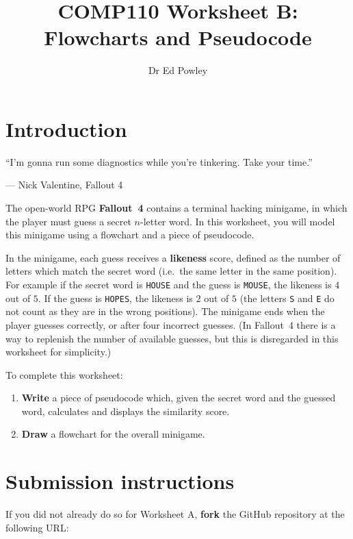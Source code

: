 \documentclass{../../fal_assignment}
\title{COMP110 Worksheet B: Flowcharts and Pseudocode}
\author{Dr Ed Powley}
\begin{document}
\maketitle

\section*{Introduction}

\begin{marginquote}
``I'm gonna run some diagnostics while you're tinkering. Take your time.''

--- Nick Valentine, Fallout 4
\end{marginquote}

The open-world RPG \textbf{Fallout~4} contains a terminal hacking minigame, in which
the player must guess a secret $n$-letter word.
In this worksheet, you will model this minigame using a flowchart and a piece of pseudocode.

In the minigame, each guess receives a \textbf{likeness} score,
defined as the number of letters which match the secret word (i.e.\ the same letter in the same position).
For example if the secret word is \texttt{HOUSE} and the guess is \texttt{MOUSE}, the likeness is $4$ out of $5$.
If the guess is \texttt{HOPES}, the likeness is $2$ out of $5$
(the letters \texttt{S} and \texttt{E} do not count as they are in the wrong positions).
The minigame ends when the player guesses correctly, or after four incorrect guesses.
(In Fallout~4 there is a way to replenish the number of available guesses,
but this is disregarded in this worksheet for simplicity.)

To complete this worksheet:
\begin{enumerate}[label=(\alph*)]
	\item \textbf{Write} a piece of pseudocode which, given the secret word and the guessed word,
		calculates and displays the similarity score.
	\item \textbf{Draw} a flowchart for the overall minigame.
\end{enumerate}

\section*{Submission instructions}

If you did not already do so for Worksheet A, \textbf{fork} the GitHub repository at the following URL:
\end{document}

